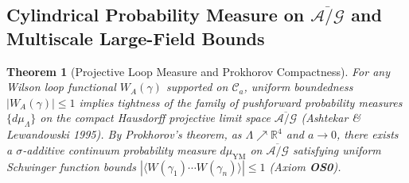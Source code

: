 \documentclass[11pt, a4paper]{article}
\newtheorem{theorem}{Theorem}[section]
\theoremstyle{definition}
\theoremstyle{remark}
\begin{document}
\subsection{Cylindrical Probability Measure on $\overline{\mathcal{A}/\mathcal{G}}$ and Multiscale Large-Field Bounds}
\begin{theorem}[Projective Loop Measure and Prokhorov Compactness]
\label{thm:prokhorov}
For any Wilson loop functional $W_{A}(\gamma)$ supported on $\mathcal{C}_{a}$, uniform boundedness $|W_{A}(\gamma)| \le 1$ implies tightness of the family of pushforward probability measures $\{d\mu_{\Lambda}\}$ on the compact Hausdorff projective limit space $\overline{\mathcal{A}/\mathcal{G}}$ (Ashtekar \& Lewandowski 1995). By Prokhorov's theorem, as $\Lambda \nearrow \mathbb{R}^{4}$ and $a \to 0$, there exists a $\sigma$-additive continuum probability measure $d\mu_{\mathrm{YM}}$ on $\overline{\mathcal{A}/\mathcal{G}}$ satisfying uniform Schwinger function bounds $|\langle W(\gamma_{1})\cdots W(\gamma_{n})\rangle| \le 1$ (Axiom \textbf{OS0}).
\end{theorem}
\end{document}
